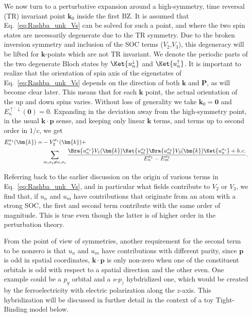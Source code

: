 We now turn to a perturbative expansion around a high-symmetry, time reversal (TR) invariant point $\bm{k}_0$ inside the first BZ.
It is assumed that Eq.~\ref{eq:Rashba_unk_Vs} can be solved for such a point, and where the two spin states are necessarily degenerate due to the TR symmetry.
Due to the broken inversion symmetry and inclusion of the SOC terms ($V_2$,$V_3$), this degeneracy will be lifted for $\bm{k}$-points which are not TR invariant.
We denote the periodic parts of the two degenerate Bloch states by $\Ket{u_n^\downarrow}$ and $\Ket{u_n^\uparrow}$.
It is important to realize that the orientation of spin axis of the eigenstates of Eq.~\ref{eq:Rashba_unk_Vs} depends on the direction of both $\bm{k}$ and $\bm{P}$, as will become clear later.
This means that for each $\bm{k}$ point, the actual orientation of the up and down spins varies.
Without loss of generality we take $\bm{k}_0 = \bm{0}$ and $E^{\uparrow,\downarrow}_n(\bm{0}) = 0$.
Expanding in the deviation away from the high-symmetry point, in the usual $\bm{k}\cdot\bm{p}$ sense, and keeping only linear $\bm{k}$ terms, and terms up to second order in $1/c$, we get
\begin{align}
	\label{eq:kp_expansion}
	E_n^{\sigma_1}(\bm{k}) =& - V_2^{\sigma_1}(\bm{k}) + \\
		& \sum_{m,\sigma_2 \neq n,\sigma_1}\frac{\Bra{u_n^{\sigma_1}} V_1(\bm{k}) \Ket{u_m^{\sigma_2}}\Bra{u_m^{\sigma_2}} V_3(\bm{k}) \Ket{u_n^{\sigma_1}} + h.c.}{E_n^{\sigma_1} - E_m^{\sigma_2}}.
\end{align}

Referring back to the earlier discussion on the origin of various terms in Eq.~\ref{eq:Rashba_unk_Vs}, and in particular what fields contribute to $V_2$ or $V_3$, we find that, if $u_n$ and $u_m$ have contributions that originate from an atom with a strong SOC, the first and second term contribute with the same order of magnitude.
This is true even though the latter is of higher order in the perturbation theory.

From the point of view of symmetries, another requirement for the second term to be nonzero is that $u_n$ and $u_m$ have contributions with different parity, since $\bm{p}$ is odd in spatial coordinates, $\bm{k} \cdot \bm{p}$ is only non-zero when one of the constituent orbitals is odd with respect to a spatial direction and the other even.
One example could be a $p_y$ orbital and a $s$-$p_z$ hybdridized one, which would be created by the ferroelectricity with electric polarization along the $z$-axis.
This hybridization will be discussed in further detail in the context of a toy Tight-Binding model below.

